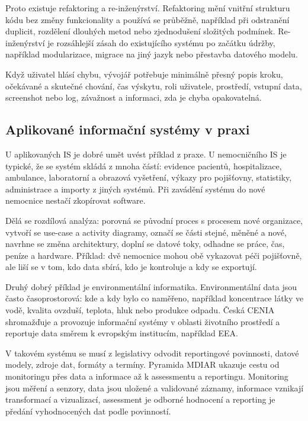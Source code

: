 Proto existuje refaktoring a re-inženýrství. Refaktoring mění vnitřní strukturu kódu bez změny funkcionality a používá se průběžně, například při odstranění duplicit, rozdělení dlouhých metod nebo zjednodušení složitých podmínek. Re-inženýrství je rozsáhlejší zásah do existujícího systému po začátku údržby, například modularizace, migrace na jiný jazyk nebo přestavba datového modelu.

Když uživatel hlásí chybu, vývojář potřebuje minimálně přesný popis kroku, očekávané a skutečné chování, čas výskytu, roli uživatele, prostředí, vstupní data, screenshot nebo log, závažnost a informaci, zda je chyba opakovatelná.

\subsection*{Aplikované informační systémy v praxi}

U aplikovaných IS je dobré umět uvést příklad z praxe. U nemocničního IS je typické, že se systém skládá z mnoha částí: evidence pacientů, hospitalizace, ambulance, laboratorní a obrazová vyšetření, výkazy pro pojišťovny, statistiky, administrace a importy z jiných systémů. Při zavádění systému do nové nemocnice nestačí zkopírovat software.

Dělá se rozdílová analýza: porovná se původní proces s procesem nové organizace, vytvoří se use-case a activity diagramy, označí se části stejné, měněné a nové, navrhne se změna architektury, doplní se datové toky, odhadne se práce, čas, peníze a hardware. Příklad: dvě nemocnice mohou obě vykazovat péči pojišťovně, ale liší se v tom, kdo data sbírá, kdo je kontroluje a kdy se exportují.

Druhý dobrý příklad je environmentální informatika. Environmentální data jsou často časoprostorová: kde a kdy bylo co naměřeno, například koncentrace látky ve vodě, kvalita ovzduší, teplota, hluk nebo produkce odpadu. Česká CENIA shromažďuje a provozuje informační systémy v oblasti životního prostředí a reportuje data směrem k evropským institucím, například EEA.

V takovém systému se musí z legislativy odvodit reportingové povinnosti, datové modely, zdroje dat, formáty a termíny. Pyramida MDIAR ukazuje cestu od monitoringu přes data a informace až k assessmentu a reportingu. Monitoring jsou měření a senzory, data jsou uložené a validované záznamy, informace vznikají transformací a vizualizací, assessment je odborné hodnocení a reporting je předání vyhodnocených dat podle povinností.

